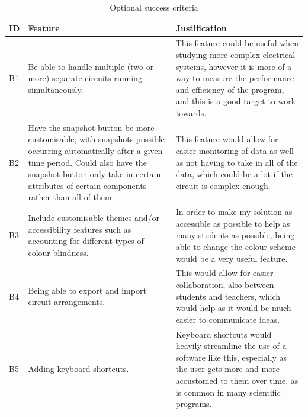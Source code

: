 \documentclass[11pt]{article}
\begin{document}
        \newpage
        \begin{table}[!h]
            \centering
            \footnotesize
            \begin{tabular}{@{}lp{206pt}p{210pt}@{}}
                \toprule
                \textbf{ID} & \textbf{Feature} & \textbf{Justification} \\ \midrule
                B1 & Be able to handle multiple (two or more) separate circuits running simultaneously. & This feature could be useful when studying more complex electrical systems, however it is more of a way to measure the performance and efficiency of the program, and this is a good target to work towards. \\ \medskip
                B2 & Have the snapshot button be more customisable, with snapshots possible occurring automatically after a given time period. Could also have the snapshot button only take in certain attributes of certain components rather than all of them. & This feature would allow for easier monitoring of data as well as not having to take in all of the data, which could be a lot if the circuit is complex enough. \\ \medskip
                B3 & Include customisable themes and/or accessibility features such as accounting for different types of colour blindness. & In order to make my solution as accessible as possible to help as many students as possible, being able to change the colour scheme would be a very useful feature. \\ \medskip
                B4 & Being able to export and import circuit arrangements. & This would allow for easier collaboration, also between students and teachers, which would help as it would be much easier to communicate ideas. \\ \medskip
                B5 & Adding keyboard shortcuts. & Keyboard shortcuts would heavily streamline the use of a software like this, especially as the user gets more and more accustomed to them over time, as is common in many scientific programs. \\
                \bottomrule
            \end{tabular}
            \caption{Optional success criteria}
            \label{tbl:optional_succ_crit}
        \end{table}
\end{document}
